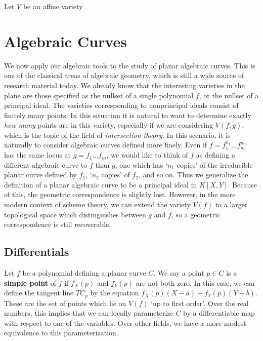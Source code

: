 Let $V$ be an affine variety 










\chapter{Algebraic Curves}

We now apply our algebraic tools to the study of planar algebraic curves. This is one of the classical areas of algebraic geometry, which is still a wide source of research material today. We already know that the interesting varieties in the plane are those specified as the nullset of a single polynomial $f$, or the nullset of a principal ideal. The varieties corresponding to nonprincipal ideals consist of finitely many points. In this situation it is natural to want to determine exactly {\it how many} points are in this variety, especially if we are considering $V(f,g)$, which is the topic of the field of {\it intersection theory}. In this scenario, it is naturally to consider algebraic curves defined more finely. Even if $f = f_1^{n_1} \dots f_m^{n_m}$ has the same locus at $g = f_1 \dots f_m$, we would like to think of $f$ as defining a different algebraic curve to $f$ than $g$, one which has `$n_1$ copies' of the irreducible planar curve defined by $f_1$, `$n_2$ copies' of $f_2$, and so on. Thus we generalize the definition of a planar algebraic curve to be a principal ideal in $K[X,Y]$. Because of this, the geometric correspondence is slightly lost. However, in the more modern context of scheme theory, we can extend the variety $V(f)$ to a larger topological space which distinguishes between $g$ and $f$, so a geometric correspondence is still recoverable.

\section{Differentials}

Let $f$ be a polynomial defining a planar curve $C$. We say a point $p \in C$ is a {\bf simple point} of $f$ if $f_X(p)$ and $f_Y(p)$ are not both zero. In this case, we can define the tangent line $TC_p$ by the equation $f_X(p) (X - a) + f_Y(p) (Y - b)$. These are the set of points which lie on $V(f)$ `up to first order'. Over the real numbers, this implies that we can locally parameterize $C$ by a differentiable map with respect to one of the variables. Over other fields, we have a more modest equivalence to this parameterization.

